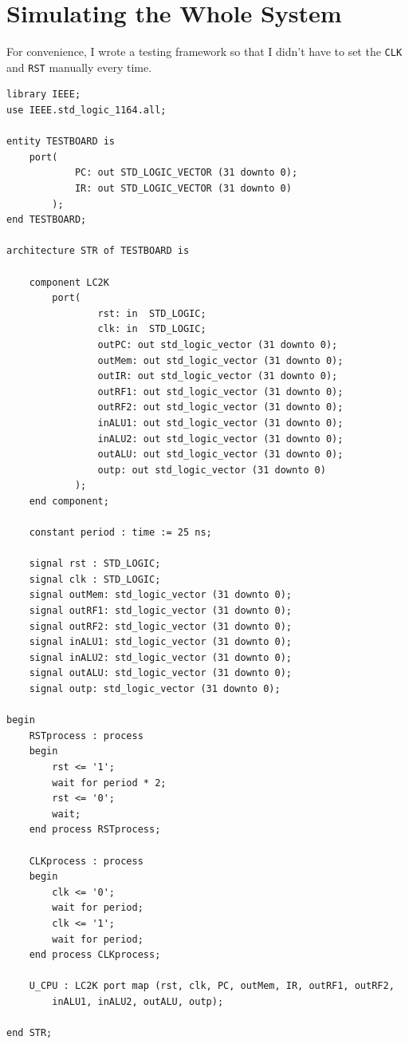 \documentclass[a4paper]{article}
\begin{document}
\section{Simulating the Whole System}
For convenience, I wrote a testing framework so that I didn't have to set the \verb|CLK| and \verb|RST| manually every time.
\begin{verbatim}
library IEEE;
use IEEE.std_logic_1164.all;

entity TESTBOARD is
    port(
            PC: out STD_LOGIC_VECTOR (31 downto 0);
            IR: out STD_LOGIC_VECTOR (31 downto 0)
        );
end TESTBOARD;

architecture STR of TESTBOARD is

    component LC2K
        port(
                rst: in  STD_LOGIC;
                clk: in  STD_LOGIC;
                outPC: out std_logic_vector (31 downto 0);
                outMem: out std_logic_vector (31 downto 0);
                outIR: out std_logic_vector (31 downto 0);
                outRF1: out std_logic_vector (31 downto 0);
                outRF2: out std_logic_vector (31 downto 0);
                inALU1: out std_logic_vector (31 downto 0);
                inALU2: out std_logic_vector (31 downto 0);
                outALU: out std_logic_vector (31 downto 0);
                outp: out std_logic_vector (31 downto 0)
            );
    end component;

    constant period : time := 25 ns;

    signal rst : STD_LOGIC;
    signal clk : STD_LOGIC;
    signal outMem: std_logic_vector (31 downto 0);
    signal outRF1: std_logic_vector (31 downto 0);
    signal outRF2: std_logic_vector (31 downto 0);
    signal inALU1: std_logic_vector (31 downto 0);
    signal inALU2: std_logic_vector (31 downto 0);
    signal outALU: std_logic_vector (31 downto 0);
    signal outp: std_logic_vector (31 downto 0);

begin
    RSTprocess : process
    begin
        rst <= '1';
        wait for period * 2;
        rst <= '0';
        wait;
    end process RSTprocess;

    CLKprocess : process
    begin
        clk <= '0';
        wait for period;
        clk <= '1';
        wait for period;
    end process CLKprocess;

    U_CPU : LC2K port map (rst, clk, PC, outMem, IR, outRF1, outRF2,
        inALU1, inALU2, outALU, outp);

end STR;
\end{verbatim}
\end{document}
